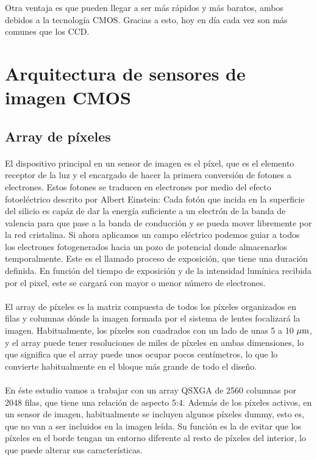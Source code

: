 Otra ventaja es que pueden llegar a ser más rápidos y más baratos, ambos debidos
a la tecnología CMOS. Gracias a esto, hoy en día cada vez son más comunes que los
CCD.

\section{Arquitectura de sensores de imagen CMOS}

\subsection{Array de píxeles}\label{cap:pxa_array}

\paragraph{}
El dispositivo principal en un sensor de imagen es el píxel, que es el elemento
receptor de la luz y el encargado de hacer la primera conversión de fotones a
electrones. Estos fotones se traducen en electrones por medio del efecto fotoeléctrico
descrito por Albert Einstein: Cada fotón que incida en la superficie del silicio
es capáz de dar la energía suficiente a un electrón de la banda de valencia para que
pase a la banda de conducción y se pueda mover libremente por la red cristalina.
Si ahora aplicamos un campo eléctrico podemos guiar a todos los electrones
fotogenerados hacia un pozo de potencial donde almacenarlos temporalmente. Este
es el llamado proceso de exposición, que tiene una duración definida. En función
del tiempo de exposición y de la intensidad lumínica recibida por el pixel, este
se cargará con mayor o menor número de electrones.

\paragraph{}
El array de píxeles es la matriz compuesta de todos los píxeles organizados en filas
y columnas dónde la imagen formada por el sistema de lentes focalizará la imagen.
Habitualmente, los píxeles son cuadrados con un lado de unas 5 a 10 $\mu\text{m}$, y el
array puede tener resoluciones de miles de píxeles en ambas dimensiones, lo que
significa que el array puede unos ocupar pocos centímetros, lo que lo convierte
habitualmente en el bloque más grande de todo el diseño.

\paragraph{}
En éste estudio vamos a trabajar con un array QSXGA de 2560 columnas por 2048 filas,
que tiene una relación de aspecto 5:4. Además de los píxeles activos, en un sensor
de imagen, habitualmente se incluyen algunos píxeles dummy, esto es, que no van
a ser incluidos en la imagen leída. Su función es la de evitar que los píxeles
en el borde tengan un entorno diferente al resto de píxeles del interior, lo que
puede alterar sus características.

